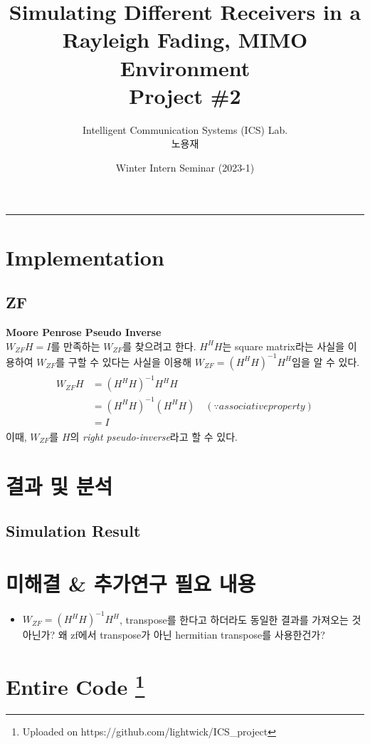 \documentclass{article}
\title{Simulating Different Receivers in a \\Rayleigh Fading, MIMO Environment\\
\large Project \#2}
\author{Intelligent Communication Systems (ICS) Lab.\\노용재}
\date{Winter Intern Seminar (2023-1)}
\newcommand{\bd}{\textbf} %
\begin{document}
\maketitle
\tableofcontents
\vspace{0.5cm}
\hrule
\vspace{0.5cm}

\section{Implementation}
\subsection{ZF}
\bd{Moore Penrose Pseudo Inverse}\\
$W_{ZF}H=I$를 만족하는 $W_{ZF}$를 찾으려고 한다. $H^H H$는 square matrix라는 사실을 이용하여 $W_{ZF}$를 구할 수 있다는 사실을 이용해 $W_{ZF}=(H^H H)^{-1}H^H$임을 알 수 있다.
\begin{gather}
	\begin{split}
		W_{ZF}H&=(H^H H)^{-1}H^H H\\
		&=(H^H H)^{-1}(H^H H) \quad (\because associative property)\\
		&=I
	\end{split}
\end{gather}
이때, $W_{ZF}$를 $H$의 \textsl{right pseudo-inverse}라고 할 수 있다.
\section{결과 및 분석}
\subsection{Simulation Result}

\section{미해결 \& 추가연구 필요 내용}
\begin{itemize}
  \item $W_{ZF}=(H^H H)^{-1}H^H$, transpose를 한다고 하더라도 동일한 결과를 가져오는 것 아닌가? 왜 zf에서 transpose가 아닌 hermitian transpose를 사용한건가?
\end{itemize}
\section[Entire Code]{Entire Code \footnote{Uploaded on https://github.com/lightwick/ICS\_project}}
\end{document}
